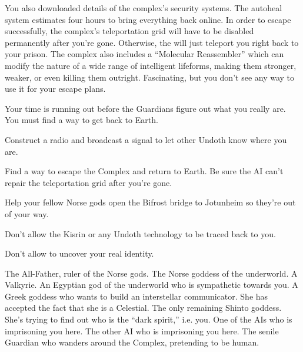 \documentclass[char]{guardians}
\begin{document}
You also downloaded details of the complex's security systems. The autoheal system estimates four hours to bring everything back online. In order to escape successfully, the complex's teleportation grid will have to be disabled permanently after you're gone. Otherwise, the \cWarden{} will just teleport you right back to your prison. The complex also includes a ``Molecular Reassembler'' which can modify the nature of a wide range of intelligent lifeforms, making them stronger, weaker, or even killing them outright. Fascinating, but you don't see any way to use it for your escape plans.




Your time is running out before the Guardians figure out what you really are. You must find a way to get back to Earth.


\begin{itemz}[Goals]
  \item Construct a radio and broadcast a signal to let other Undoth know where you are.
  \item Find a way to escape the Complex and return to Earth. Be sure the AI can't repair the teleportation grid after you're gone.
  \item Help your fellow Norse gods open the Bifrost bridge to Jotunheim so they're out of your way.
  \item Don't allow the Kisrin or any Undoth technology to be traced back to you.
  \item Don't allow \cAmaterasu{} to uncover your real identity.
\end{itemz}

\begin{contacts}
  \contact{\cOdin{}} The All-Father, ruler of the Norse gods.
  \contact{\cHel{}} The Norse goddess of the underworld.
  \contact{\cVal{}} A Valkyrie.
  \contact{\cAnubis{}} An Egyptian god of the underworld who is sympathetic towards you.
  \contact{\cAthena{}} A Greek goddess who wants to build an interstellar communicator. She has accepted the fact that she is a Celestial.
  \contact{\cAmaterasu{}} The only remaining Shinto goddess. She's trying to find out who is the ``dark spirit,'' i.e. you.
   One of the AIs who is imprisoning you here.
   The other AI who is imprisoning you here.
  \contact{\cJascha{}} The senile Guardian who wanders around the Complex, pretending to be human.
\end{contacts}
\end{document}
